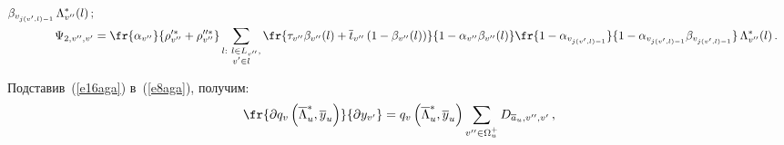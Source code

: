 \begin{align*}
{   \beta_{ v_{j(v^\prime,l)-1}}}\, \Lambda^*_{ v^{\prime\prime}}(l)\,;
\\
   \Psi_{2, v^{\prime\prime}, v^\prime} &=
   \fr{\alpha_{ v^{\prime\prime}}}{\rho_{ v^{\prime\prime}}^{\prime 
*}+\rho_{ v^{\prime\prime}}^{\prime\prime *}} %
   \sum\limits_{\substack{{l:\ l\in L_{ v^{\prime\prime}},}\\ {v^\prime\in l}}} 
   \fr{\tau_{ v^{\prime\prime}}\beta_{ v^{\prime\prime}}(l)+\overline{t}_{ 
v^{\prime\prime}}\left(1-\beta_{ v^{\prime\prime}}(l)\right)}
   {1-\alpha_{ v^{\prime\prime}}\beta_{ v^{\prime\prime}}(l)}
   \fr{1-\alpha_{v_{j(v^\prime,l)-1}}}{1-\alpha_{ v_{j(v^\prime,l)-1}}
   \beta_{ v_{j(v^\prime,l)-1}}}\, \Lambda^*_{ v^{\prime\prime}}(l)\,.
   \end{align*}
   
   
   Подставив~(\ref{e16aga}) в~(\ref{e8aga}), получим:
   \begin{equation}
   \fr{\partial q_v\left(\overline{\Lambda}_u^*, \overline{y}_u\right)}{\partial 
y_{v^\prime}}=q_v\left( \overline{\Lambda}_u^*, 
\overline{y}_u\right)\sum\limits_{ v^{\prime\prime}\in \Omega_u^+} 
D_{\overline{a}_u, v^{\prime\prime}, v^\prime}\,,
   \label{e17aga}
   \end{equation}
   
   

